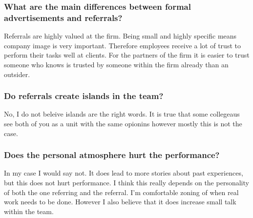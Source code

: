 \documentclass[Main.tex]{subfiles}
\begin{document}
\subsubsection*{What are the main differences between formal advertisements and referrals?}

Referrals are highly valued at the firm. Being small and highly specific means company image is very important. Therefore employees receive a lot of trust to perform their tasks well at clients. For the partners of the firm it is easier to trust someone who knows is trusted by someone within the firm already than an outsider. 

\subsubsection*{Do referrals create islands in the team?}

No, I do not beleive islands are the right words. It is true that some collegeaus see both of you as a unit with the same opionins however mostly this is not the case. 

\subsubsection*{Does the personal atmosphere hurt the performance?}

In my case I would say not. It does lead to more stories about past experiences, but this does not hurt performance. I think this really depends on the personality of both the one referring and the referral. I'm comfortable zoning of when real work needs to be done. However I also believe that it does increase small talk within the team. 
\end{document}
